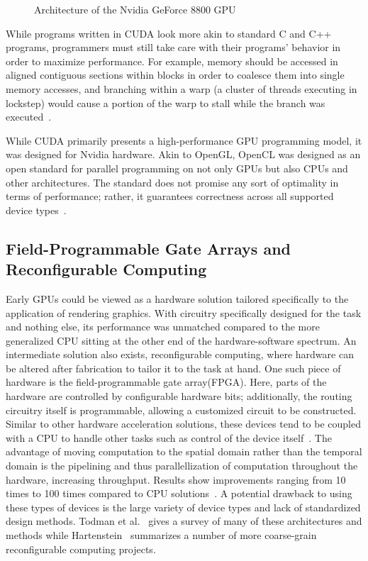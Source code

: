 \begin{figure}
\begin{center}
\end{center}
\caption{Architecture of the Nvidia GeForce 8800 GPU~\cite{g80_brief}}
\label{fig:g80}
\end{figure}

While programs written in CUDA look more akin to standard C and C++ programs,
programmers must still take care with their programs' behavior in
order to maximize performance. For example, memory should be accessed
in aligned contiguous sections within blocks in order to coalesce them
into single memory accesses, and branching within a warp (a cluster
of threads executing in lockstep) would cause a portion of the warp to
stall while the branch was executed~\cite{nvidia_cuda_guide}.

While CUDA primarily presents a high-performance GPU programming model,
it was designed for Nvidia hardware. Akin to OpenGL, OpenCL was designed
as an open standard for parallel programming on not only GPUs but also
CPUs and other architectures. The standard does not promise any sort
of optimality in terms of performance; rather, it guarantees correctness
across all supported device types~\cite{opencl}.

\subsection{Field-Programmable Gate Arrays and Reconfigurable Computing}

Early GPUs could be viewed as a hardware solution tailored specifically
to the application of rendering graphics. With circuitry specifically
designed for the task and nothing else, its performance was unmatched
compared to the more generalized CPU sitting at the other end of the
hardware-software spectrum.  An intermediate solution also exists,
reconfigurable computing, where hardware can be altered after fabrication
to tailor it to the task at hand. One such piece of hardware is the
field-programmable gate array(FPGA). Here, parts of the hardware are
controlled by configurable hardware bits; additionally, the routing
circuitry itself is programmable, allowing a customized circuit to be
constructed. Similar to other hardware acceleration solutions, these
devices tend to be coupled with a CPU to handle other tasks such
as control of the device itself~\cite{reconfigurable_survey}. The
advantage of moving computation to the spatial domain rather than
the temporal domain is the pipelining and thus parallellization of
computation throughout the hardware, increasing throughput. Results
show improvements ranging from 10 times to 100 times compared to CPU
solutions~\cite{reconfigurable_tutorial}. A potential drawback to using
these types of devices is the large variety of device types and lack of
standardized design methods. Todman et al.~\cite{reconfigurable_arch}
gives a survey of many of these architectures and methods while
Hartenstein~\cite{reconfigurable_decade} summarizes a number of more
coarse-grain reconfigurable computing projects.

